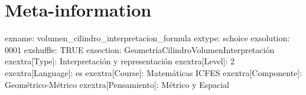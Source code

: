 \documentclass[
]{article}
\begin{document}
\section{Meta-information}\label{meta-information}

exname: volumen\_cilindro\_interpretacion\_formula extype: schoice
exsolution: 0001 exshuffle: TRUE exsection:
Geometría\textbar Cilindro\textbar Volumen\textbar Interpretación
exextra{[}Type{]}: Interpretación y representación exextra{[}Level{]}: 2
exextra{[}Language{]}: es exextra{[}Course{]}: Matemáticas ICFES
exextra{[}Componente{]}: Geométrico-Métrico exextra{[}Pensamiento{]}:
Métrico y Espacial
\end{document}
